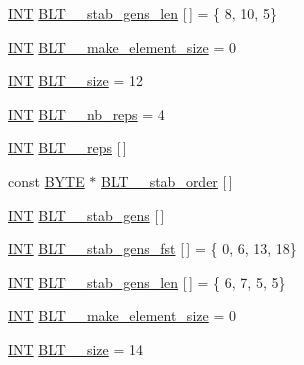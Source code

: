 \begin{DoxyCompactItemize}
\item 
\mbox{\hyperlink{galois_8h_a09fddde158a3a20bd2dcadb609de11dc}{I\+NT}} \mbox{\hyperlink{data___b_l_t_8_c_a9bf0b684eb03f04f655a509a91bbe6eb}{B\+L\+T\+\_\+\_\+stab\+\_\+gens\+\_\+len}} \mbox{[}$\,$\mbox{]} = \{ 8, 10, 5\}
\item 
\mbox{\hyperlink{galois_8h_a09fddde158a3a20bd2dcadb609de11dc}{I\+NT}} \mbox{\hyperlink{data___b_l_t_8_c_a0228813806ea2450fda39898ebe57946}{B\+L\+T\+\_\+\_\+make\+\_\+element\+\_\+size}} = 0
\item 
\mbox{\hyperlink{galois_8h_a09fddde158a3a20bd2dcadb609de11dc}{I\+NT}} \mbox{\hyperlink{data___b_l_t_8_c_aefa7b368b32c3ed7eceef404ef01ce47}{B\+L\+T\+\_\+\_\+size}} = 12
\item 
\mbox{\hyperlink{galois_8h_a09fddde158a3a20bd2dcadb609de11dc}{I\+NT}} \mbox{\hyperlink{data___b_l_t_8_c_aa4f276c44728a7e04a6b3c7e9122e921}{B\+L\+T\+\_\+\_\+nb\+\_\+reps}} = 4
\item 
\mbox{\hyperlink{galois_8h_a09fddde158a3a20bd2dcadb609de11dc}{I\+NT}} \mbox{\hyperlink{data___b_l_t_8_c_aee4909033dcdbbe3937285e8a19c4103}{B\+L\+T\+\_\+\_\+reps}} \mbox{[}$\,$\mbox{]}
\item 
const \mbox{\hyperlink{galois_8h_ab6cc7b4aeb6ea31aba2b3fbfc83ff5e6}{B\+Y\+TE}} $\ast$ \mbox{\hyperlink{data___b_l_t_8_c_ac1444edc8aa724d76f1c3c0901b90246}{B\+L\+T\+\_\+\_\+stab\+\_\+order}} \mbox{[}$\,$\mbox{]}
\item 
\mbox{\hyperlink{galois_8h_a09fddde158a3a20bd2dcadb609de11dc}{I\+NT}} \mbox{\hyperlink{data___b_l_t_8_c_a5701e8453560051195b9e2993ef694c4}{B\+L\+T\+\_\+\_\+stab\+\_\+gens}} \mbox{[}$\,$\mbox{]}
\item 
\mbox{\hyperlink{galois_8h_a09fddde158a3a20bd2dcadb609de11dc}{I\+NT}} \mbox{\hyperlink{data___b_l_t_8_c_adce0ef587be67246f515d5fe978cf9fe}{B\+L\+T\+\_\+\_\+stab\+\_\+gens\+\_\+fst}} \mbox{[}$\,$\mbox{]} = \{ 0, 6, 13, 18\}
\item 
\mbox{\hyperlink{galois_8h_a09fddde158a3a20bd2dcadb609de11dc}{I\+NT}} \mbox{\hyperlink{data___b_l_t_8_c_adfad241a51bd2337a39d1c10aceb8cfa}{B\+L\+T\+\_\+\_\+stab\+\_\+gens\+\_\+len}} \mbox{[}$\,$\mbox{]} = \{ 6, 7, 5, 5\}
\item 
\mbox{\hyperlink{galois_8h_a09fddde158a3a20bd2dcadb609de11dc}{I\+NT}} \mbox{\hyperlink{data___b_l_t_8_c_ad30bd7d8a668b40a8c824e0256c2fb77}{B\+L\+T\+\_\+\_\+make\+\_\+element\+\_\+size}} = 0
\item 
\mbox{\hyperlink{galois_8h_a09fddde158a3a20bd2dcadb609de11dc}{I\+NT}} \mbox{\hyperlink{data___b_l_t_8_c_a6edda5aa4a0b4a9100b28804c2a15fdb}{B\+L\+T\+\_\+\_\+size}} = 14

\end{DoxyCompactItemize}
